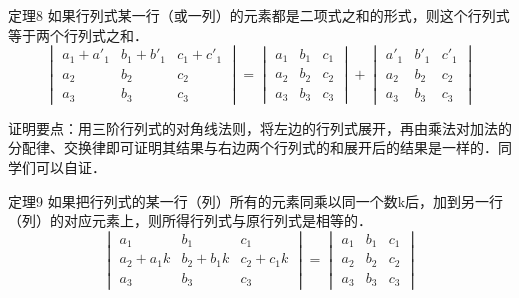 \begin{blk}{定理8}
如果行列式某一行（或一列）的元素都是二项式之和的形式，则这个行列式等于两个行列式之和．
\[\begin{vmatrix}
    a_1+a'_1&b_1+b'_1&c_1+c'_1\\a_2&b_2&c_2\\a_3&b_3&c_3
\end{vmatrix}=\begin{vmatrix}
    a_1&b_1&c_1\\a_2&b_2&c_2\\a_3&b_3&c_3
\end{vmatrix}+\begin{vmatrix}
    a'_1&b'_1&c'_1\\a_2&b_2&c_2\\a_3&b_3&c_3
\end{vmatrix}\]
\end{blk}

证明要点：用三阶行列式的对角线法则，将左边的行列式展开，再由乘法对加法的分配律、交换律即可证明其结果与右边两个行列式的和展开后的结果是一样的．同学们可以自证．

\begin{blk}{定理9}
    如果把行列式的某一行（列）所有的元素同乘以同一个数k后，加到另一行（列）的对应元素上，则所得行列式与原行列式是相等的．
\[\begin{vmatrix}
    a_1&b_1&c_1\\a_2+a_1k&b_2+b_1k&c_2+c_1k\\a_3&b_3&c_3
\end{vmatrix}=\begin{vmatrix}
    a_1&b_1&c_1\\a_2&b_2&c_2\\a_3&b_3&c_3
\end{vmatrix}\]
\end{blk}

